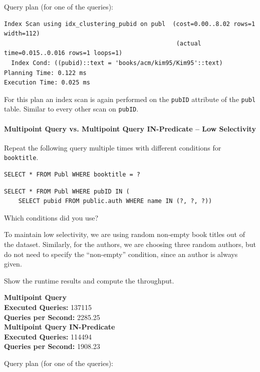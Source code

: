 \documentclass[11pt]{scrartcl}
\begin{document}
Query plan (for one of the queries):

{\small
\parskip0pt\begin{verbatim}
Index Scan using idx_clustering_pubid on publ  (cost=0.00..8.02 rows=1 width=112)
                                                (actual time=0.015..0.016 rows=1 loops=1)
  Index Cond: ((pubid)::text = 'books/acm/kim95/Kim95'::text)
Planning Time: 0.122 ms
Execution Time: 0.025 ms
\end{verbatim}}

For this plan an index scan is again performed on the \texttt{pubID} attribute of the \texttt{publ} table.
Similar to every other scan on \texttt{pubID}.

\paragraph{Multipoint Query vs. Multipoint Query IN-Predicate -- Low Selectivity}

Repeat the following query multiple times with different conditions for \texttt{booktitle}.

\begin{lstlisting}[style=dbtsql]
SELECT * FROM Publ WHERE booktitle = ?
\end{lstlisting}

\begin{lstlisting}[style=dbtsql]
SELECT * FROM Publ WHERE pubID IN (
    SELECT pubid FROM public.auth WHERE name IN (?, ?, ?))
\end{lstlisting}


Which conditions did you use?

To maintain low selectivity, we are using random non-empty book titles out of the dataset.
Similarly, for the authors, we are choosing three random authors, but do not need to specify the \enquote{non-empty}
condition, since an author is always given.

Show the runtime results and compute the throughput.

\textbf{Multipoint Query}\\
\textbf{Executed Queries: } 137115\\
\textbf{Queries per Second: } 2285.25 \\

\textbf{Multipoint Query IN-Predicate}\\
\textbf{Executed Queries: } 114494\\
\textbf{Queries per Second: } 1908.23

Query plan (for one of the queries):
\end{document}
